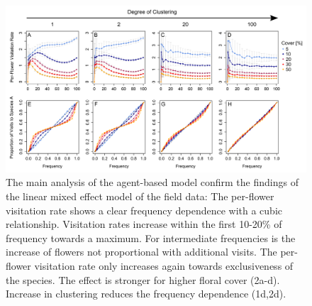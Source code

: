 \begin{figure} [!ht] %
	\centering
	\includegraphics[width=17cm]{Images/PFV}
	\caption{The main analysis of the agent-based model confirm the findings of the linear mixed effect model of the field data: The per-flower visitation rate shows a clear frequency dependence with a cubic relationship. Visitation rates increase within the first 10-20\% of frequency towards a maximum. For intermediate frequencies is the increase of flowers not proportional with additional visits. The per-flower visitation rate only increases again towards exclusiveness of the species. The effect is stronger for higher floral cover (2a-d). Increase in clustering reduces the frequency dependence (1d,2d).}
	\label{fig:PFV}
\end{figure}

